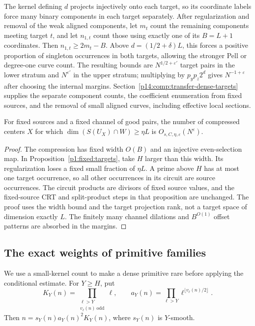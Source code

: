 The kernel defining $d$ projects injectively onto each target, so its
coordinate labels force many binary components in each target separately.
After regularization and removal of the weak aligned components, let
$m_t$ count the remaining components meeting target $t$, and let $n_{1,t}$
count those using exactly one of its $B=L+1$ coordinates. Then
$n_{1,t}\geq2m_t-B$. Above $d=(1/2+\delta)L$, this forces a positive
proportion of singleton occurrences in both targets, allowing the stronger
Pell or degree-one curve count. The resulting bounds are
$N^{1/2+\varepsilon'}$ target pairs in the lower stratum and
$N^{\varepsilon'}$ in the upper stratum; multiplying by $p_yp_z2^d$
gives $N^{-1+\varepsilon}$ after choosing the internal margins.
Section~\ref{p14:comp:transfer-dense-targets} supplies the separate
component counts, the coefficient enumeration from fixed sources, and
the removal of small aligned curves, including effective local sections.


\begin{lemma}
\label{p13:transfer:compressed-target}
For fixed sources and a fixed channel of good pairs, the number of
compressed centers $X$ for which
$\dim(S(U_X)\cap W)\geq\eta L$ is $O_{s,C,\eta,\varepsilon}(N^\varepsilon)$.
\end{lemma}

\begin{proof}
The compression has fixed width $O(B)$ and an injective even-selection
map. In Proposition~\ref{p1:fixed:targets}, take $H$ larger than this
width. Its regularization loses a fixed small fraction of $\eta L$.
A prime above $H$ has at most one target occurrence, so all other
occurrences in its circuit are source occurrences. The circuit products
are divisors of fixed source values, and the fixed-source CRT and
split-product steps in that proposition are unchanged. The proof uses
the width bound and the target projection rank, not a target space of
dimension exactly $L$. The finitely many channel dilations and
$B^{O(1)}$ offset patterns are absorbed in the margins.
\end{proof}

\subsection{The exact weights of primitive families}

We use a small-kernel count to make a dense primitive rare before applying
the conditional estimate. For $Y\geq H$, put
\[
 K_Y(n)=\prod_{\substack{\ell>Y\\v_\ell(n)\ \mathrm{odd}}}\ell,\qquad
 a_Y(n)=\prod_{\ell>Y}\ell^{\lfloor v_\ell(n)/2\rfloor}.
\]
Then $n=s_Y(n)a_Y(n)^2K_Y(n)$, where $s_Y(n)$ is $Y$-smooth.


